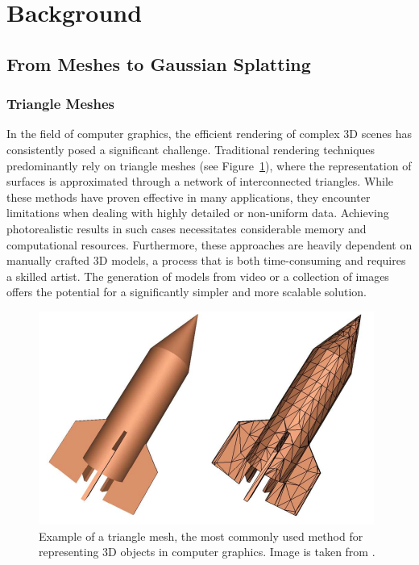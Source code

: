 \documentclass[12pt]{article}
\begin{document}
\section{Background}
\subsection{From Meshes to Gaussian Splatting}
\subsubsection{Triangle Meshes}
In the field of computer graphics, the efficient rendering of complex 3D scenes has consistently posed a significant challenge. Traditional rendering techniques predominantly rely on triangle meshes (see Figure~\ref{fig:trianglemesh}), where the representation of surfaces is approximated through a network of interconnected triangles. While these methods have proven effective in many applications, they encounter limitations when dealing with highly detailed or non-uniform data. Achieving photorealistic results in such cases necessitates considerable memory and computational resources. Furthermore, these approaches are heavily dependent on manually crafted 3D models, a process that is both time-consuming and requires a skilled artist. The generation of models from video or a collection of images offers the potential for a significantly simpler and more scalable solution.
\begin{figure}[h!]
	\centering
	\includegraphics[width=\textwidth]{Images/TriangleMesh.png}
	\caption{Example of a triangle mesh, the most commonly used method for representing 3D objects in computer graphics. Image is taken from \cite{Mesh}.}
	\label{fig:trianglemesh}
\end{figure}
\newpage
\end{document}
